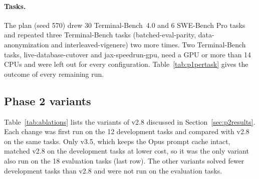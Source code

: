 \paragraph{Tasks.}
The plan (seed 570) drew 30 Terminal-Bench~4.0 and 6 SWE-Bench Pro tasks and repeated three Terminal-Bench tasks
(batched-eval-parity, data-anonymization and interleaved-vigenere) two more times. Two Terminal-Bench tasks,
live-database-cutover and jax-speedrun-gpu, need a GPU or more than 14 CPUs and were left out for every
configuration. Table~\ref{tab:p1pertask} gives the outcome of every remaining run.



\subsection{Phase 2 variants}
\label{app:p2}

Table~\ref{tab:ablations} lists the variants of v2.8 discussed in Section~\ref{sec:p2results}. Each change was
first run on the 12 development tasks and compared with v2.8 on the same tasks. Only v3.5, which keeps the Opus
prompt cache intact, matched v2.8 on the development tasks at lower cost, so it was the only variant also run on
the 18 evaluation tasks (last row). The other variants solved fewer development tasks than v2.8 and were not run
on the evaluation tasks.

